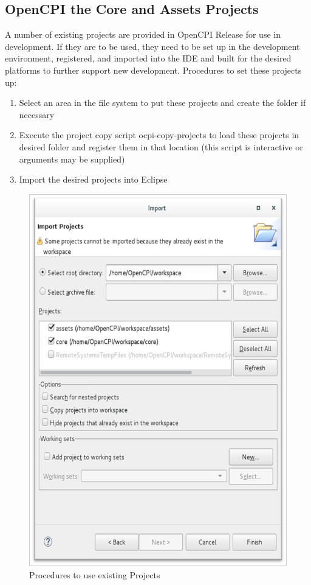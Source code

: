 \documentclass[10pt, a4paper, oneside]{article}
\begin{document}
\subsection{OpenCPI the Core and Assets Projects}
A number of existing projects are provided in OpenCPI Release for use in development. If they are to be used, they need to be set up in the development environment, registered, and imported into the IDE and built for the desired platforms to further support new development. Procedures to set these projects up:
\begin{enumerate}
\item	Select an area in the file system to put these projects and create the folder if necessary
\item	Execute the project copy script ocpi-copy-projects to load these projects in desired folder and register them in that location (this script is interactive or arguments may be supplied)
\item	Import the desired projects into Eclipse
\end{enumerate}
\begin{figure}[h!]
	\centering
	\caption{Procedures to use existing Projects}\label{fig:Procedures to use existing Projects}
	\includegraphics[width=.60\textwidth]{ProcedurestouseexistingProjects.png}
 \end{figure}
\end{document}

